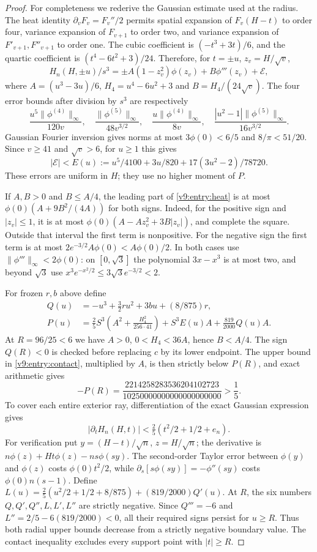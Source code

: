 \begin{proof}
For completeness we rederive the Gaussian estimate used at the radius.
The heat identity $\partial_vF_v=F_v''/2$ permits spatial expansion of
$F_v(H-t)$ to order four, variance expansion of $F_{v+1}$ to order two,
and variance expansion of $F'_{v+1},F''_{v+1}$ to order one. The cubic
coefficient is $(-t^3+3t)/6$, and the quartic coefficient is
$(t^4-6t^2+3)/24$. Therefore, for $t=\pm u$, $z_v=H/\sqrt v$,
\begin{equation}\label{v9:entry:heat}
 H_n(H,\pm u)/s^3
 =\pm A(1-z_v^2)\phi(z_v)+B\phi'''(z_v)+\mathcal E,
\end{equation}
where $A=(u^3-3u)/6$, $H_4=u^4-6u^2+3$ and $B=H_4/(24\sqrt v)$.
The four error bounds after division by $s^3$ are respectively
\[
 \frac{u^5\|\phi^{(4)}\|_\infty}{120v},\quad
 \frac{\|\phi^{(5)}\|_\infty}{48v^{3/2}},\quad
 \frac{u\|\phi^{(4)}\|_\infty}{8v},\quad
 \frac{|u^2-1|\|\phi^{(5)}\|_\infty}{16v^{3/2}}.
\]
Gaussian Fourier inversion gives norms at most $3\phi(0)<6/5$ and
$8/\pi<51/20$. Since $v\ge41$ and $\sqrt v>6$, for $u\ge1$ this gives
\[
 |\mathcal E|<E(u):=u^5/4100+3u/820+17(3u^2-2)/78720.
\]
These errors are uniform in $H$; they use no higher moment of $P$.

If $A,B>0$ and $B\le A/4$, the leading part of \eqref{v9:entry:heat}
is at most $\phi(0)(A+9B^2/(4A))$ for both signs. Indeed, for the
positive sign and $|z_v|\le1$, it is at most
$\phi(0)(A-Az_v^2+3B|z_v|)$, and complete the square. Outside that
interval the first term is nonpositive. For the negative sign the first
term is at most $2e^{-3/2}A\phi(0)<A\phi(0)/2$. In both cases use
$\|\phi'''\|_\infty<2\phi(0)$: on $[0,\sqrt3]$ the polynomial
$3x-x^3$ is at most two, and beyond $\sqrt3$ use
$x^3e^{-x^2/2}\le3\sqrt3e^{-3/2}<2$.

For frozen $r,b$ above define
\begin{align*}
 Q(u)&=-u^3+\tfrac32ru^2+3bu+(8/875)r,\\
 P(u)&=\tfrac25 S^3\left(A^2+\frac{H_4^2}{256\cdot41}\right)
                         +S^3E(u)A+\frac{819}{2000}Q(u)A.
\end{align*}
At $R=96/25<6$ we have $A>0$, $0<H_4<36A$, hence $B<A/4$.
The sign $Q(R)<0$ is checked before replacing $c$ by its lower endpoint.
The upper bound in \eqref{v9:entry:contact}, multiplied by $A$, is then
strictly below $P(R)$, and exact arithmetic gives
\[
 -P(R)=\frac{2214258283536204102723}{10250000000000000000000}>\frac15.
\]
To cover each entire exterior ray, differentiation of the exact Gaussian
expression gives
\[
 |\partial_tH_n(H,t)|<\tfrac25(t^2/2+1/2+e_n).
\]
For verification put $y=(H-t)/\sqrt n$, $z=H/\sqrt n$; the derivative is
$n\phi(z)+Ht\phi(z)-ns\phi(sy)$. The second-order Taylor error between
$\phi(y)$ and $\phi(z)$ costs $\phi(0)t^2/2$, while
$\partial_s[s\phi(sy)]=-\phi''(sy)$ costs $\phi(0)n(s-1)$.
Define $L(u)=\tfrac25(u^2/2+1/2+8/875)+(819/2000)Q'(u)$.
At $R$, the six numbers $Q,Q',Q'',L,L',L''$ are strictly negative.
Since $Q'''=-6$ and $L''=2/5-6(819/2000)<0$, all their required signs
persist for $u\ge R$. Thus both radial upper bounds decrease from a
strictly negative boundary value. The contact inequality excludes every
support point with $|t|\ge R$.
\end{proof}

